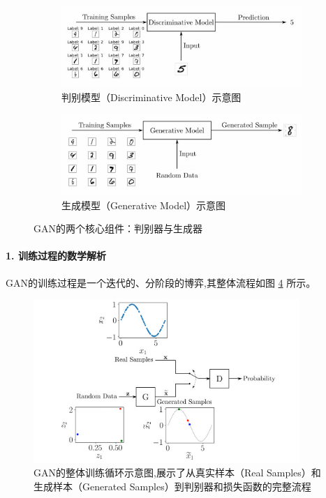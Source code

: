 \begin{itemize}
    \begin{figure}[H]
        \centering
        \begin{subfigure}[b]{0.48\textwidth}
            \centering
            \includegraphics[width=\textwidth]{figures/GAN1.png}
            \caption{判别模型（Discriminative Model）示意图}
            \label{fig:gan_discriminator_model}
        \end{subfigure}
        \hfill
        \begin{subfigure}[b]{0.48\textwidth}
            \centering
            \includegraphics[width=\textwidth]{figures/GAN2.png}
            \caption{生成模型（Generative Model）示意图}
            \label{fig:gan_generative_model}
        \end{subfigure}
        \caption{GAN的两个核心组件：判别器与生成器}
        \label{fig:gan_components}
    \end{figure}

    \paragraph{1. 训练过程的数学解析}
    GAN的训练过程是一个迭代的、分阶段的博弈,其整体流程如图 \ref{fig:gan_full_training_loop} 所示。

    \begin{figure}[H]
        \centering
        \includegraphics[width=0.9\textwidth]{figures/GAN4.png}
        \caption{GAN的整体训练循环示意图,展示了从真实样本（Real Samples）和生成样本（Generated Samples）到判别器和损失函数的完整流程}
        \label{fig:gan_full_training_loop}
    \end{figure}
    

\end{itemize}
